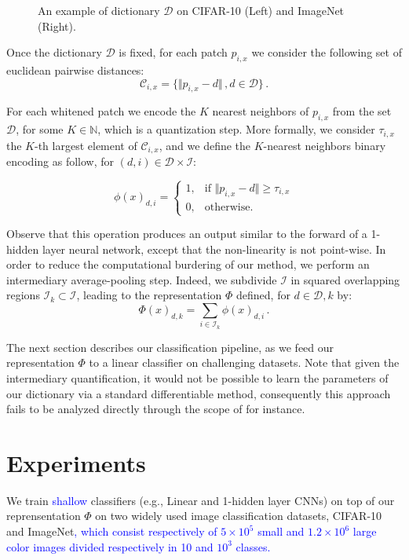 \documentclass{article}
\newcommand{\Edouard}[1]{\textcolor{blue}{#1}}
\begin{document}
{\begin{figure}
  \centering
  \fbox{\rule[-.5cm]{0cm}{4cm} \rule[-.5cm]{4cm}{0cm}}
  \caption{An example of dictionary $\mathcal{D}$ on CIFAR-10 (Left) and ImageNet (Right).\label{dico}}
\end{figure}

Once the dictionary $\mathcal{D}$ is fixed, for each patch $p_{i,x}$ we consider the following set of euclidean pairwise distances:
\[\mathcal{C}_{i, x} =\{\Vert p_{i, x} - d \Vert\,, d\in\mathcal{D} \}\,.\]
 
For each whitened patch we encode the $K$ nearest neighbors of $p_{i,x}$ from the set $\mathcal{D}$, for some $ K \in \mathbb{N}$, which is a quantization step.
More formally, we consider $\tau_{i,x}$ the $K$-th largest element of $\mathcal{C}_{i,x}$, and we define the $K$-nearest neighbors binary encoding as follow, for $(d,i)\in\mathcal{D}\times\mathcal{I}$:


\begin{equation}
\phi(x)_{d,i}=
\begin{cases}
1,&\text{if } \Vert  p_{i,x} - d\Vert \geq \tau_{i,x}\\
0,&\text{otherwise}.
\end{cases}
\end{equation}






Observe that this operation produces an output similar to the forward of a 1-hidden layer neural network, except that the non-linearity is not point-wise. In order to reduce the computational burdering of our method, we perform an intermediary average-pooling step.
Indeed, we subdivide $\mathcal{I}$ in squared overlapping regions $\mathcal{I}_k\subset\mathcal{I}$, leading to the representation $\Phi$ defined, for $d\in\mathcal{D}, k$ by:
\[\Phi(x)_{d,k}= \sum_{i\in \mathcal{I}_k}\phi(x)_{d,i}\,.\]

The next section describes our classification pipeline, as we feed our representation $\Phi$ to a linear classifier on challenging datasets. Note that given the intermediary quantification, it would not be possible to learn the parameters of our dictionary via a standard differentiable method, consequently this approach fails to be analyzed directly through the scope of \cite{chizat2018global} for instance.




\section{Experiments}
\label{experiments}
We train  \Edouard{shallow} classifiers (e.g., Linear and 1-hidden layer CNNs) on top of our reprensentation $\Phi$ on two widely used image classification datasets,  CIFAR-10 and ImageNet\Edouard{, which consist respectively of $5\times10^5$ small and $1.2\times10^6$ large color images  divided respectively in 10 and $10^3$ classes.}


}
\end{document}
